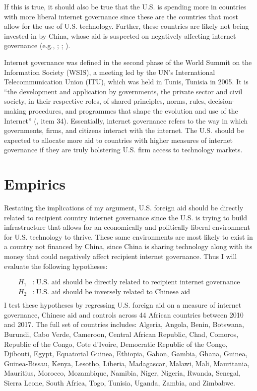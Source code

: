 \documentclass[12pt]{article}
\begin{document}
If this is true, it should also be true that the U.S. is spending more in countries with more liberal internet governance since these are the countries that most allow for the use of U.S. technology. Further, these countries are likely not being invested in by China, whose aid is suspected on negatively affecting internet governance (e.g., \cite{triolo2020}; \cite{hillman2021}; \cite{u.s.departmentofstate2022}).

Internet governance was defined in the second phase of the World Summit on the Information Society (WSIS), a meeting led by the UN's International Telecommunication Union (ITU), which was held in Tunis, Tunisia in 2005. It is ``the development and application by governments, the private sector and civil society, in their respective roles, of shared principles, norms, rules, decision-making procedures, and programmes that shape the evolution and use of the Internet'' (\cite{worldsummitontheinformationsociety2005}, item 34). Essentially, internet governance refers to the way in which governments, firms, and citizens interact with the internet. The U.S. should be expected to allocate more aid to countries with higher measures of internet governance if they are truly bolstering U.S. firm access to technology markets.

\section*{Empirics}
Restating the implications of my argument, U.S. foreign aid should be directly related to recipient country internet governance since the U.S. is trying to build infrastructure that allows for an economically and politically liberal environment for U.S. technology to thrive. These same environments are most likely to exist in a country not financed by China, since China is sharing technology along with its money that could negatively affect recipient internet governance. Thus I will evaluate the following hypotheses:

\begin{align*}
    H_{1}&:\;\text{U.S. aid should be directly related to recipient internet governance}\\
    H_{2}&:\;\text{U.S. aid should be inversely related to Chinese aid}\\
\end{align*}
I test these hypotheses by regressing U.S. foreign aid on a measure of internet governance, Chinese aid and controls across 44 African countries between 2010 and 2017. The full set of countries includes: Algeria, Angola, Benin, Botswana, Burundi, Cabo Verde, Cameroon, Central African Republic, Chad, Comoros, Republic of the Congo, Cote d'Ivoire, Democratic Republic of the Congo, Djibouti, Egypt, Equatorial Guinea, Ethiopia, Gabon, Gambia, Ghana, Guinea, Guinea-Bissau, Kenya, Lesotho, Liberia, Madagascar, Malawi, Mali, Mauritania, Mauritius, Morocco, Mozambique, Namibia, Niger, Nigeria, Rwanda, Senegal, Sierra Leone, South Africa, Togo, Tunisia, Uganda, Zambia, and Zimbabwe. 
\end{document}
